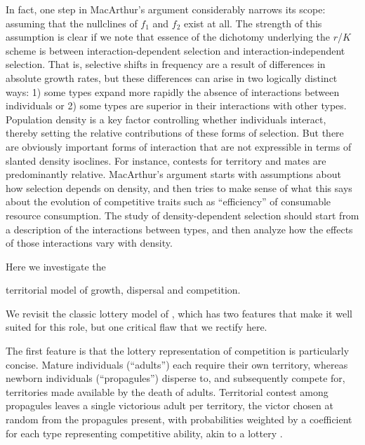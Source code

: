 \documentclass[11pt]{article}
\begin{document}
In fact, one step in MacArthur's argument considerably narrows its scope: assuming that the nullclines of $f_1$ and $f_2$ exist at all. The strength of this assumption is clear if we note that essence of the dichotomy underlying the $r$/$K$ scheme is between interaction-dependent selection and interaction-independent selection. That is, selective shifts in frequency are a result of differences in absolute growth rates, but these differences can arise in two logically distinct ways: 1) some types expand more rapidly the absence of interactions between individuals or 2) some types are superior in their interactions with other types. Population density is a key factor controlling whether individuals interact, thereby setting the relative contributions of these forms of selection. But there are obviously important forms of interaction that are not expressible in terms of slanted density isoclines. For instance, contests for territory and mates are predominantly relative. MacArthur's argument starts with assumptions about how selection depends on density, and then tries to make sense of what this says about the evolution of competitive traits such as ``efficiency'' of consumable resource consumption. The study of density-dependent selection should start from a description of the interactions between types, and then analyze how the effects of those interactions vary with density. 


Here we investigate the 

territorial model of growth, dispersal and competition. 

We revisit the classic lottery model of \cite{chesson_1981}, which has two features that make it well suited for this role, but one critical flaw that we rectify here.

The first feature is that the lottery representation of competition is  particularly concise. Mature individuals (``adults'') each require their own territory, whereas newborn individuals (``propagules'') disperse to, and subsequently compete for, territories made available by the death of adults. Territorial contest among propagules leaves a single victorious adult per territory, the victor chosen at random from the propagules present, with probabilities weighted by a coefficient for each type representing competitive ability, akin to a lottery \citep{sale_77}.  
\end{document}
